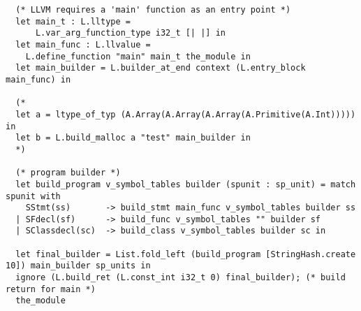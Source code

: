 \documentclass{article}
\begin{document}
\begin{verbatim}
  (* LLVM requires a 'main' function as an entry point *)
  let main_t : L.lltype =
      L.var_arg_function_type i32_t [| |] in
  let main_func : L.llvalue =
    L.define_function "main" main_t the_module in
  let main_builder = L.builder_at_end context (L.entry_block main_func) in

  (*
  let a = ltype_of_typ (A.Array(A.Array(A.Array(A.Primitive(A.Int))))) in
  let b = L.build_malloc a "test" main_builder in
  *)

  (* program builder *) 
  let build_program v_symbol_tables builder (spunit : sp_unit) = match spunit with
    SStmt(ss)       -> build_stmt main_func v_symbol_tables builder ss
  | SFdecl(sf)      -> build_func v_symbol_tables "" builder sf
  | SClassdecl(sc)  -> build_class v_symbol_tables builder sc in
     
  let final_builder = List.fold_left (build_program [StringHash.create 10]) main_builder sp_units in
  ignore (L.build_ret (L.const_int i32_t 0) final_builder); (* build return for main *)
  the_module
\end{verbatim}

 
\end{document}
